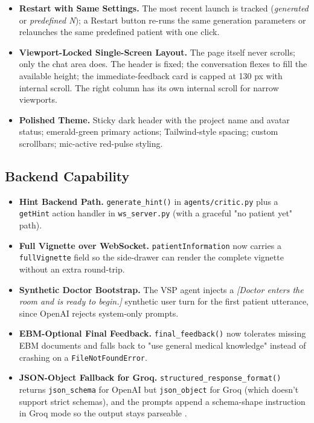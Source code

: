 \documentclass{article}
\begin{document}
\begin{itemize}
    \item \textbf{Restart with Same Settings.} The most recent launch is tracked (\emph{generated} or \emph{predefined N}); a Restart button re-runs the same generation parameters or relaunches the same predefined patient with one click.

    \item \textbf{Viewport-Locked Single-Screen Layout.} The page itself never scrolls; only the chat area does. The header is fixed; the conversation flexes to fill the available height; the immediate-feedback card is capped at 130 px with internal scroll. The right column has its own internal scroll for narrow viewports.

    \item \textbf{Polished Theme.} Sticky dark header with the project name and avatar status; emerald-green primary actions; Tailwind-style spacing; custom scrollbars; mic-active red-pulse styling.
\end{itemize}

\subsection{Backend Capability}
\begin{itemize}
    \item \textbf{Hint Backend Path.} \texttt{generate\_hint()} in \texttt{agents/critic.py} plus a \texttt{getHint} action handler in \texttt{ws\_server.py} (with a graceful "no patient yet" path).

    \item \textbf{Full Vignette over WebSocket.} \texttt{patientInformation} now carries a \texttt{fullVignette} field so the side-drawer can render the complete vignette without an extra round-trip.

    \item \textbf{Synthetic Doctor Bootstrap.} The VSP agent injects a \emph{[Doctor enters the room and is ready to begin.]} synthetic user turn for the first patient utterance, since OpenAI rejects system-only prompts.

    \item \textbf{EBM-Optional Final Feedback.} \texttt{final\_feedback()} now tolerates missing EBM documents and falls back to "use general medical knowledge" instead of crashing on a \texttt{FileNotFoundError}.

    \item \textbf{JSON-Object Fallback for Groq.} \texttt{structured\_response\_format()} returns \texttt{json\_schema} for OpenAI but \texttt{json\_object} for Groq (which doesn't support strict schemas), and the prompts append a schema-shape instruction in Groq mode so the output stays parseable \cite{Mahajan2022TextualDQ}.
\end{itemize}
\end{document}
